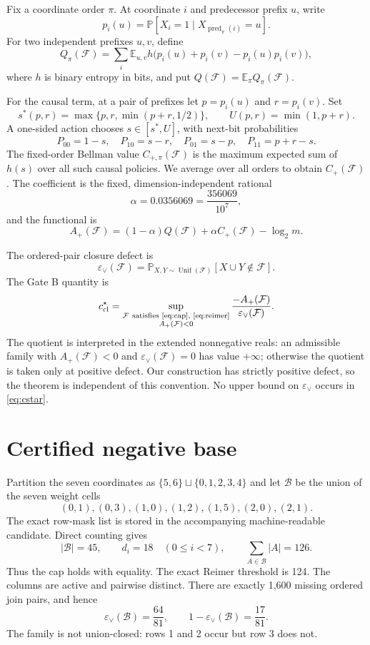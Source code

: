 \documentclass[11pt]{article}
\theoremstyle{remark}
\newcommand{\F}{\mathcal F}
\newcommand{\B}{\mathcal B}
\newcommand{\eps}{\varepsilon}
\newcommand{\E}{\mathbb E}
\newcommand{\Prob}{\mathbb P}
\begin{document}
Fix a coordinate order $\pi$.  At coordinate $i$ and predecessor prefix $u$,
write
\[
 p_i(u)=\Prob[X_i=1\mid X_{\operatorname{pred}_\pi(i)}=u].
\]
For two independent prefixes $u,v$, define
\[
 Q_\pi(\F)=\sum_i\E_{u,v}
 h\bigl(p_i(u)+p_i(v)-p_i(u)p_i(v)\bigr),
\]
where $h$ is binary entropy in bits, and put $Q(\F)=\E_\pi Q_\pi(\F)$.

For the causal term, at a pair of prefixes let $p=p_i(u)$ and $r=p_i(v)$.
Set
\[
 s^*(p,r)=\max\{p,r,\min(p+r,1/2)\},\qquad U(p,r)=\min(1,p+r).
\]
A one-sided action chooses $s\in[s^*,U]$, with next-bit probabilities
\[
 P_{00}=1-s,\quad P_{10}=s-r,\quad
 P_{01}=s-p,\quad P_{11}=p+r-s.
\]
The fixed-order Bellman value $C_{+,\pi}(\F)$ is the maximum expected sum of
$h(s)$ over all such causal policies.  We average over all orders to obtain
$C_+(\F)$.  The coefficient is the fixed, dimension-independent rational
\[
 \alpha=0.0356069=\frac{356069}{10^7},
\]
and the functional is
\begin{equation}
 A_+(\F)=(1-\alpha)Q(\F)+\alpha C_+(\F)-\log_2m.
 \label{eq:Aplus}
\end{equation}

The ordered-pair closure defect is
\begin{equation}
 \eps_\vee(\F)=
 \Prob_{X,Y\sim\operatorname{Unif}(\F)}[X\cup Y\notin\F].
 \label{eq:defect}
\end{equation}
The Gate B quantity is
\begin{equation}
 c_{\rm cl}^\star=
 \sup_{\substack{\F\ \text{satisfies \eqref{eq:cap}, \eqref{eq:reimer}}\\
                  A_+(\F)<0}}
 \frac{-A_+(\F)}{\eps_\vee(\F)}.
 \label{eq:cstar}
\end{equation}
The quotient is interpreted in the extended nonnegative reals: an admissible
family with $A_+(\F)<0$ and $\eps_\vee(\F)=0$ has value $+\infty$; otherwise
the quotient is taken only at positive defect.  Our construction has strictly
positive defect, so the theorem is independent of this convention.
No upper bound on $\eps_\vee$ occurs in \eqref{eq:cstar}.

\section{Certified negative base}

Partition the seven coordinates as $\{5,6\}\sqcup\{0,1,2,3,4\}$ and let $\B$
be the union of the seven weight cells
\begin{equation}
 (0,1),(0,3),(1,0),(1,2),(1,5),(2,0),(2,1).
 \label{eq:cells}
\end{equation}
The exact row-mask list is stored in the accompanying machine-readable
candidate.  Direct counting gives
\[
 |\B|=45,\qquad d_i=18\quad(0\le i<7),\qquad
 \sum_{A\in\B}|A|=126.
\]
Thus the cap holds with equality.  The exact Reimer threshold is 124.  The
columns are active and pairwise distinct.  There are exactly 1,600 missing
ordered join pairs, and hence
\begin{equation}
 \eps_\vee(\B)=\frac{64}{81},\qquad
 1-\eps_\vee(\B)=\frac{17}{81}.
 \label{eq:base-defect}
\end{equation}
The family is not union-closed: rows 1 and 2 occur but row 3 does not.
\end{document}
